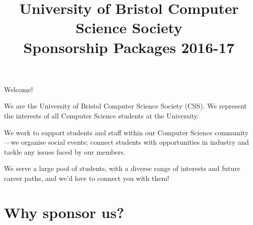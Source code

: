\documentclass[]{article}
\title{University of Bristol Computer Science Society \\ Sponsorship Packages 2016-17}
\author{}
\date{}
\begin{document}
\maketitle

Welcome!

We are the University of Bristol Computer Science Society (CSS). We represent the interests of all Computer Science students at the University. 

We work to support students and staff within our Computer Science community---we organise social events; connect students with opportunities in industry and tackle any issues faced by our members.

We serve a large pool of students, with a diverse range of interests and future career paths, and we'd love to connect you with them!

\section*{Why sponsor us?}
\end{document}
